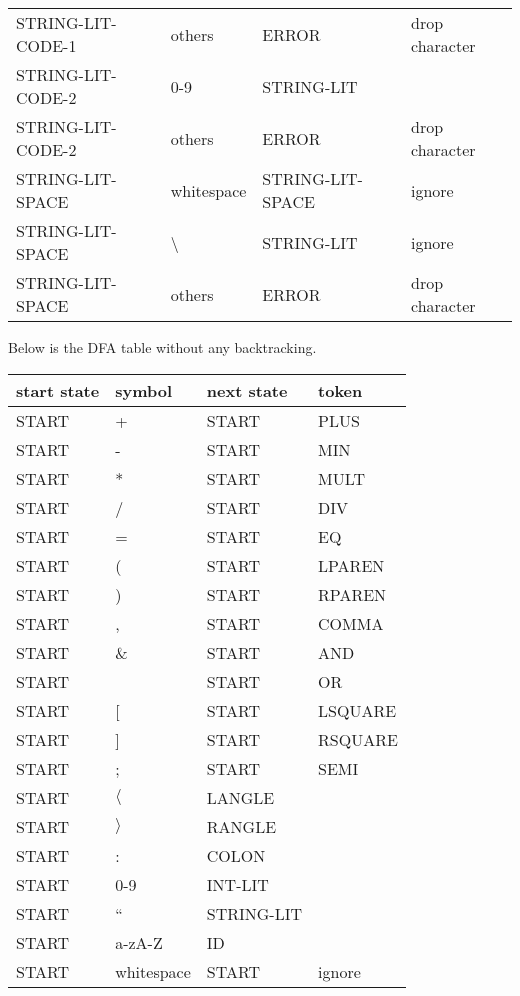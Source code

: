 \documentclass[11pt, fleqn]{article}
\begin{document}
\begin{longtable}{l|l|l|l}
STRING-LIT-CODE-1	&	others					&	ERROR			&	drop character				\\
STRING-LIT-CODE-2	&	0-9						&	STRING-LIT		&								\\
STRING-LIT-CODE-2	&	others					&	ERROR			&	drop character				\\
STRING-LIT-SPACE		&	whitespace				&	STRING-LIT-SPACE		& ignore							\\
STRING-LIT-SPACE		&	\textbackslash			&	STRING-LIT			& ignore							\\
STRING-LIT-SPACE		&	others					&	ERROR				& drop character				\\
\end{longtable}

Below is the DFA table without any backtracking.

\begin{longtable}{l|l|l|l}
start state		&	symbol						&	next	 state		&	token		 		\\
\hline
START			&	+								&	START			&	PLUS					\\
START			&	-								&	START			&	MIN					\\
START			&	*								&	START			&	MULT					\\
START			&	/								&	START			&	DIV					\\
START			&	=								&	START			&	EQ					\\
START			&	(								&	START			&	LPAREN				\\
START			&	)								&	START			&	RPAREN				\\
START			&	,								&	START			&	COMMA				\\
START			&	\&								&	START			&	AND					\\
START			&	\textbar							&	START			&	OR					\\
START			&	[								&	START			&	LSQUARE				\\
START			&	]								&	START			&	RSQUARE				\\
START			&	;								&	START			&	SEMI					\\
START			&	$\langle$						&	LANGLE			&						\\
START			&	$\rangle$						&	RANGLE			&						\\
START			&	:								&	COLON			&						\\
START			&	0-9								&	INT-LIT			&						\\
START			&	``								&	STRING-LIT		&						\\
START			&	a-zA-Z							&	ID				&						\\
START			&	whitespace						&	START			&	ignore				\\

\end{longtable}
\end{document}
